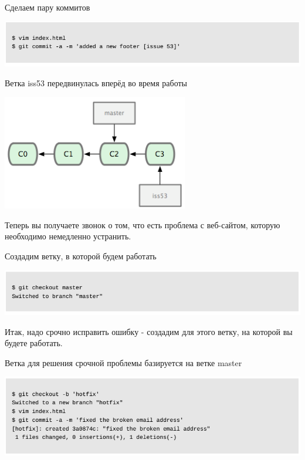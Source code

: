 \documentclass{beamer}
\begin{document}
\begin{frame}
\begin{block}{Сделаем пару коммитов}
\begin{center}
\includegraphics[scale=0.5]{images/ex-06.png}
\end{center}
\end{block}
\begin{block}{Ветка iss53 передвинулась вперёд во время работы}
\begin{center}
\includegraphics[scale=0.5]{images/ex-07.png}
\end{center}
\end{block}
\end{frame}

\begin{frame}
Теперь вы получаете звонок о том, что есть проблема с веб-сайтом, которую необходимо немедленно устранить. 
\begin{block}{Создадим ветку, в которой будем работать}
\begin{center}
\includegraphics[scale=0.5]{images/ex-08.png}
\end{center}
\end{block}
Итак, надо срочно исправить ошибку - создадим для этого ветку, на которой вы будете работать.
\begin{block}{Ветка для решения срочной проблемы базируется на ветке master}
\begin{center}
\includegraphics[scale=0.5]{images/ex-09.png}
\end{center}
\end{block}
\end{frame}
\end{document}
